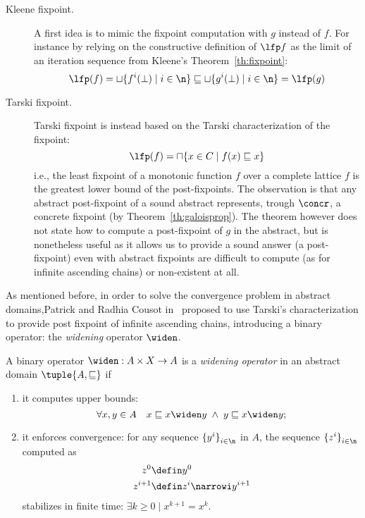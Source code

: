 \begin{description}
\item[Kleene fixpoint.] A first idea is to mimic the fixpoint
  computation with \(g\) instead of \(f\). For instance by relying on
  the constructive definition of \(\lfp f\) as the limit of an
  iteration sequence from Kleene's Theorem~\ref{th:fixpoint}:
  \begin{equation*}
    \lfp(f) = \sqcup\{f^i(\bot) \mid i \in \n\} \sqsubseteq \sqcup\{g^i(\bot) \mid i \in \n\} = \lfp(g)
  \end{equation*}
  
\item[Tarski fixpoint.] Tarski fixpoint is instead based on the Tarski
  characterization of the fixpoint:
  \begin{equation}\label{eq:tarski}
    \lfp(f) = \sqcap \{x \in C \mid f(x) \sqsubseteq x\}
  \end{equation}
  i.e., the least fixpoint of a monotonic function \(f\) over a
  complete lattice \(f\) is the greatest lower bound of the
  post-fixpoints.  The observation is that any abstract post-fixpoint of
  a sound abstract represents, trough \(\concr\), a concrete fixpoint
  (by Theorem~\ref{th:galoisprop}). The theorem however does not state
  how to compute a post-fixpoint of \(g\) in the abstract, but is
  nonetheless useful as it allows us to provide a sound answer (a
  post-fixpoint) even with abstract fixpoints are difficult to compute
  (as for infinite ascending chains) or non-existent at all.
\end{description}

As mentioned before, in order to solve the convergence problem in
abstract domains,Patrick and Radhia Cousot in~\cite{patrickradhia:one}
proposed to use Tarski's characterization to provide post fixpoint of
infinite ascending chains, introducing a binary operator: the
\emph{widening} operator \(\widen\).

\begin{definition}\label{def:widen}
  A binary operator \(\widen : A \times X \to A\) is a \emph{widening
    operator} in an abstract domain \(\tuple{A, \sqsubseteq}\) if
  \begin{enumerate}
  \item it computes upper bounds:
    \begin{equation*}
      \forall x, y \in A \quad x \sqsubseteq x \widen y \; \land \; y \sqsubseteq x \widen y;
    \end{equation*}
  \item\label{widen:prop1} it enforces convergence: for any sequence
    \({\{y^i\}}_{i\in\n}\) in \(A\), the sequence
    \({\{z^i\}}_{i\in\n}\) computed as
    \begin{align*}
      z^0 & \defin y^0 \\
      z^{i+1} & \defin z^i \narrowi y^{i+1}
    \end{align*}
    stabilizes in finite time: \(\exists k \geq 0 \mid x^{k+1} = x^k\).
  \end{enumerate}
\end{definition}

